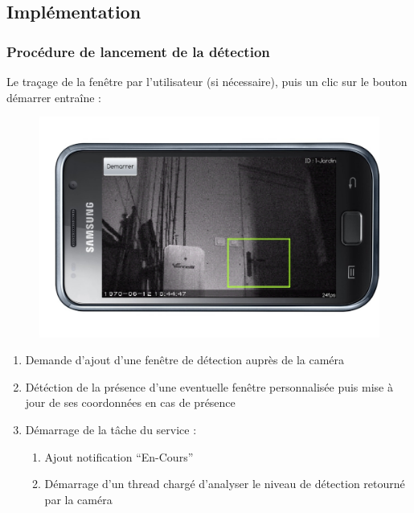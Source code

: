   \subsection{Implémentation}
  \begin{frame}
   \frametitle{Procédure de lancement de la détection}
   Le traçage de la fenêtre par l'utilisateur (si nécessaire), puis un clic sur
   \newline le bouton démarrer entraîne :
   \begin{figure}[H]
 \centering\includegraphics[scale=0.10]{Images/samsung-galaxy-s-vue3.jpg}
      \end{figure}
    \begin{enumerate}
    \item Demande d'ajout d'une fenêtre de détection auprès de la caméra
    \item Détéction de la présence d'une eventuelle fenêtre personnalisée puis
    mise à jour de ses coordonnées en cas de présence
    \item Démarrage de la tâche du service :
     \begin{enumerate}
       \item Ajout notification ``En-Cours''
       \item Démarrage d'un thread chargé d'analyser le niveau de détection
       retourné par la caméra
       \end{enumerate}
   \end{enumerate}
  \end{frame}